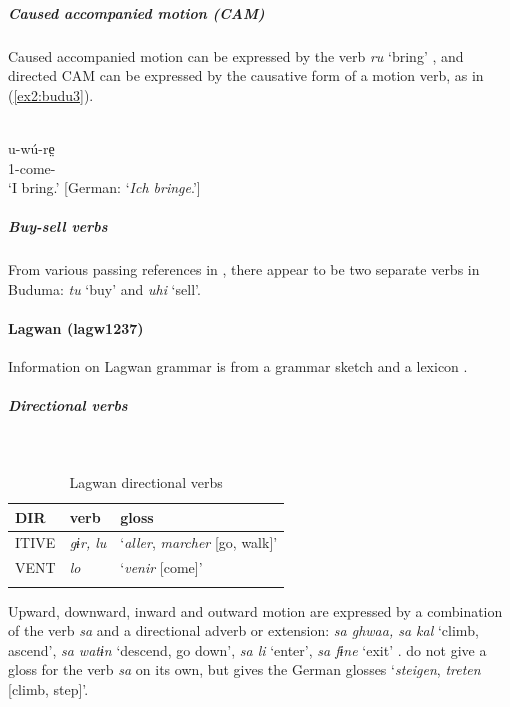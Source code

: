 \subparagraph{Caused accompanied motion (CAM)}

Caused accompanied motion can be expressed by the verb \textit{ru} `bring' \citep[49]{lukasSpracheBudumaIm1939}, and directed CAM can be expressed by the causative form of a motion verb, as in (\ref{ex2:budu3}).

\ea\label{ex2:budu3}
 \\
\gll u-wú-re̤ \\
1-come- \\
\glt `I bring.' [German: `\textit{Ich bringe}.']
\z 

\subparagraph{Buy-sell verbs}

From various passing references in \citet{lukasSpracheBudumaIm1939}, there appear to be two separate verbs in Buduma: \textit{tu} `buy' and \textit{uhi} `sell'.

\paragraph*{Lagwan (lagw1237)} \label{lagw}

Information on Lagwan grammar is from a grammar sketch \citep{lukasLogoneSpracheImZentralen1936} and a lexicon \citep{shryockLagwanFrenchEnglish2020}.

\subparagraph{Directional verbs}~

\begin{table}[H]
	\caption{Lagwan directional verbs} 
	\label{tab:lagwV}
	\begin{tabular}{lll} %
		\lsptoprule
		DIR & verb & gloss   \\ %
		\midrule
		ITIVE & \textit{gɨr, lu} & `\textit{aller}, \textit{marcher} [go, walk]' \\
		VENT & \textit{lo} & `\textit{venir} [come]' \\	
		\lspbottomrule
	\end{tabular}
\end{table}

Upward, downward, inward and outward motion are expressed by a combination of the verb \textit{sa} and a directional adverb or extension: \textit{sa ghwaa, sa kal} `climb, ascend', \textit{sa watɨn} `descend, go down', \textit{sa li} `enter', \textit{sa fɨne} `exit' \citep{shryockLagwanFrenchEnglish2020}. \citet{shryockLagwanFrenchEnglish2020} do not give a gloss for the verb \textit{sa} on its own, but \citet[116]{lukasLogoneSpracheImZentralen1936} gives the German glosses `\textit{steigen}, \textit{treten} [climb, step]'.  

